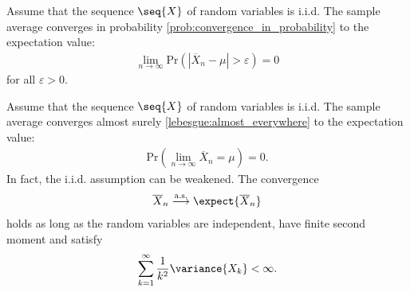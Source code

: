     \begin{theorem}
        Assume that the sequence $\seq{X}$ of random variables is i.i.d. The sample average converges in probability \ref{prob:convergence_in_probability} to the expectation value:
        \begin{gather}
            \lim_{n\rightarrow\infty}\mathrm{Pr}\left(|\overline{X}_n-\mu|>\varepsilon\right)=0
        \end{gather}
        for all $\varepsilon>0$.
    \end{theorem}
    \begin{theorem}\label{prob:strong_lln}
        Assume that the sequence $\seq{X}$ of random variables is i.i.d. The sample average converges almost surely \ref{lebesgue:almost_everywhere} to the expectation value:
        \begin{gather}
            \mathrm{Pr}\left(\lim_{n\rightarrow\infty}\overline{X}_n=\mu\right)=0.
        \end{gather}
        In fact, the i.i.d. assumption can be weakened. The convergence
        \begin{gather}
            \overline{X}_n\overset{\text{a.s.}}{\longrightarrow}\expect{\overline{X}_n}
        \end{gather}
        holds as long as the random variables are independent, have finite second moment and satisfy
        \begin{gather}
            \sum_{k=1}^\infty\frac{1}{k^2}\variance{X_k}<\infty.
        \end{gather}
    \end{theorem}


